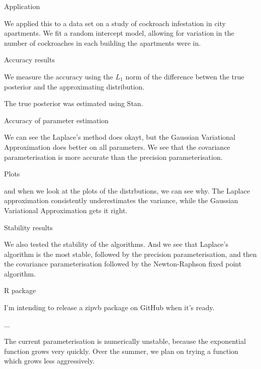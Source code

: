 \documentclass{amsart}
\begin{document}
Application

We applied this to a data set on a study of cockroach infestation in city apartments. We fit a random intercept
model, allowing for variation in the number of cockroaches in each building the apartments were in.

Accuracy results

We measure the accuracy using the $L_1$ norm of the difference betwen the true posterior and the approximating
distribution.

The true posterior was estimated using Stan.

Accuracy of parameter estimation

We can see the Laplace's method does okayt, but the Gaussian Variational Approximation does better on all
parameters. We see that the covariance parameterisation is more accurate than the precision parameterisation.

Plots

and when we look at the plots of the distrbutions, we can see why. The Laplace approximation consistently
underestimates the variance, while the Gaussian Variational Approximation gets it right.

Stability results

We also tested the stability of the algorithms. And we see that Laplace's algorithm is the most stable,
followed by the precision parameterisation, and then the covariance parameterisation followed by the
Newton-Raphson fixed point algorithm.

R package

I'm intending to release a zipvb package on GitHub when it's ready.

...

The current parameterisation is numerically unstable, because the exponential function grows very quickly.
Over the summer, we plan on trying a function which grows less aggressively.
\end{document}
